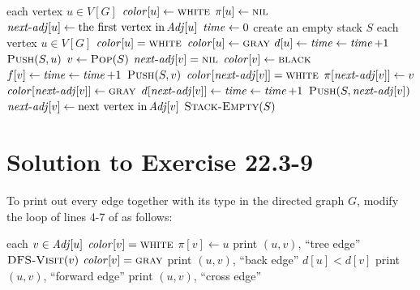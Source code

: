 \documentclass[a4paper, fleqn]{article}
\begin{document}
\begin{codebox}
\li \For each vertex $u \in V[G]$
\li   \Do
        $\id{color}[u] \gets \const{white}$
\li     $\pi[u] \gets \textnormal{\scshape nil}$
\li     $\id{next-adj}[u] \gets \mbox{the first vertex in} \id{Adj}[u]$
      \End
\li $\id{time} \gets 0$
\li create an empty stack $S$
\li \For each vertex $u \in V[G]$
\li   \Do
        \If $\id{color}[u] = \const{white}$
\li       \Then
            $\id{color}[u] \gets \const{gray}$
\li         $d[u] \gets \id{time} \gets \id{time} + 1$
\li         $\textnormal{\scshape Push}(S, u)$
\li         \Repeat
                $v \gets \textnormal{\scshape Pop}(S)$
\li             \If $\id{next-adj}[v] = \const{nil}$
\li               \Then
                    $\id{color}[v] \gets \const{black}$
\li                 $f[v] \gets \id{time} \gets \id{time} + 1$
\li               \Else
                    $\textnormal{\scshape Push}(S, v)$
\li                 \If $\id{color}[ \id{next-adj}[v] ] = \const{white}$
\li                   \Then
                         $\pi[ \id{next-adj}[v] ] \gets v$
\li                      $\id{color}[ \id{next-adj}[v] ] \gets \const{gray}$
\li                      $d[ \id{next-adj}[v] ] \gets \id{time} \gets \id{time} + 1$
\li                      $\proc{Push}(S, \id{next-adj}[v])$
                      \End
\li                 $\id{next-adj}[v] \gets \mbox{next vertex in} \id{Adj}[v]$
                  \End
\li         \Until $\textnormal{\scshape Stack-Empty}(S)$
          \End
      \End
\end{codebox}


\section*{Solution to Exercise 22.3-9}

To print out every edge together with its type in the directed graph $G$, modify the  loop of lines 4-7 of  as follows:

\begin{codebox}
\li \For each $v \in \id{Adj}[u]$
\li   \Do
        \If $\id{color}[v] = \const{white}$
\li       \Then
            $\pi[v] \gets u$
\li         print $(u, v)$, ``tree edge''
\li         $\textnormal{\scshape DFS-Visit}(v)$
\li     \ElseIf $\id{color}[v] = \const{gray}$
\li       \Then
            print $(u, v)$, ``back edge''
\li     \ElseIf $d[u] < d[v]$
\li       \Then
            print $(u, v)$, ``forward edge''
\li     \ElseNoIf
            print $(u, v)$, ``cross edge''
        \End
      \End
\end{codebox}
\end{document}
